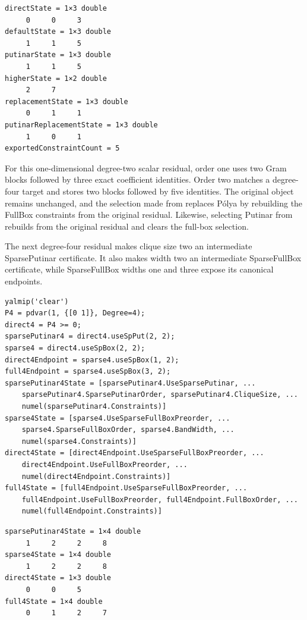 \begin{lstlisting}[style=dpoutput]
directState = 1×3 double
     0     0     3
defaultState = 1×3 double
     1     1     5
putinarState = 1×3 double
     1     1     5
higherState = 1×2 double
     2     7
replacementState = 1×3 double
     0     1     1
putinarReplacementState = 1×3 double
     1     0     1
exportedConstraintCount = 5
\end{lstlisting}

For this one-dimensional degree-two scalar residual, order one uses two  Gram blocks followed by three exact coefficient identities. Order two matches a degree-four target and stores two  blocks followed by five identities. The original  object remains unchanged, and the selection made from  replaces P\'olya by rebuilding the FullBox constraints from the original residual. Likewise, selecting Putinar from  rebuilds from the original residual and clears the full-box selection.

The next degree-four residual makes clique size two an intermediate SparsePutinar certificate. It also makes width two an intermediate SparseFullBox certificate, while SparseFullBox widths one and three expose its canonical endpoints.

\begin{lstlisting}[style=dpmatlab]
yalmip('clear')
P4 = pdvar(1, {[0 1]}, Degree=4);
direct4 = P4 >= 0;
sparsePutinar4 = direct4.useSpPut(2, 2);
sparse4 = direct4.useSpBox(2, 2);
direct4Endpoint = sparse4.useSpBox(1, 2);
full4Endpoint = sparse4.useSpBox(3, 2);
sparsePutinar4State = [sparsePutinar4.UseSparsePutinar, ...
    sparsePutinar4.SparsePutinarOrder, sparsePutinar4.CliqueSize, ...
    numel(sparsePutinar4.Constraints)]
sparse4State = [sparse4.UseSparseFullBoxPreorder, ...
    sparse4.SparseFullBoxOrder, sparse4.BandWidth, ...
    numel(sparse4.Constraints)]
direct4State = [direct4Endpoint.UseSparseFullBoxPreorder, ...
    direct4Endpoint.UseFullBoxPreorder, ...
    numel(direct4Endpoint.Constraints)]
full4State = [full4Endpoint.UseSparseFullBoxPreorder, ...
    full4Endpoint.UseFullBoxPreorder, full4Endpoint.FullBoxOrder, ...
    numel(full4Endpoint.Constraints)]
\end{lstlisting}

\begin{lstlisting}[style=dpoutput]
sparsePutinar4State = 1×4 double
     1     2     2     8
sparse4State = 1×4 double
     1     2     2     8
direct4State = 1×3 double
     0     0     5
full4State = 1×4 double
     0     1     2     7
\end{lstlisting}


